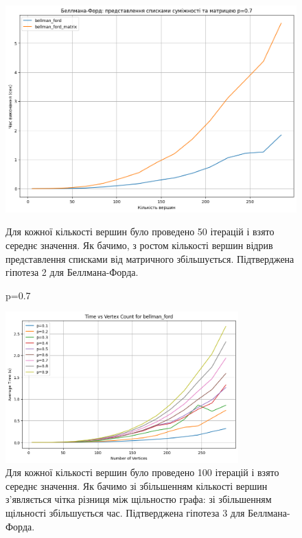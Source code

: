 \documentclass[a4paper,12pt]{article}
\begin{document}
\begin{figure}[ht]
    
    \vspace{10pt} 
    \begin{minipage}{0.45\textwidth}
        \centering
        \includegraphics[width=\textwidth]{img/bellman07.png}
        \caption{p=0.7}
        \label{fig:bellman07}
    \end{minipage}
    
    Для кожної кількості вершин було проведено 50 ітерацій і взято середнє значення. Як бачимо, з ростом кількості вершин відрив представлення списками від матричного збільшується. 
    Підтверджена гіпотеза 2 для Беллмана-Форда.
\end{figure}

\begin{figure}[ht]
    \centering
    \includegraphics[width=0.8\textwidth]{img/p_bellman.png}
    \caption{Для кожної кількості вершин було проведено 100 ітерацій і взято середнє значення. Як бачимо зі збільшенням кількості вершин з'являється чітка різниця між щільностю графа: 
    зі збільшенням щільності збільшується час. Підтверджена гіпотеза 3 для Беллмана-Форда.}
    \label{fig:p_bellman}
\end{figure}
\end{document}
